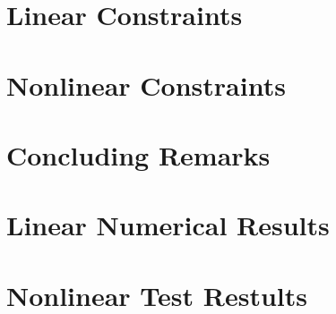 \documentclass[11pt,letterpaper]{thesis2}
\begin{document}
\chapter{Linear Constraints}\label{chap:linear}

\chapter{Nonlinear Constraints}\label{chap:general}

\chapter{Concluding Remarks}\label{chap:conclusion}


\appendix

\chapter{Linear Numerical Results}


\chapter{Nonlinear Test Restults}






\end{document}
